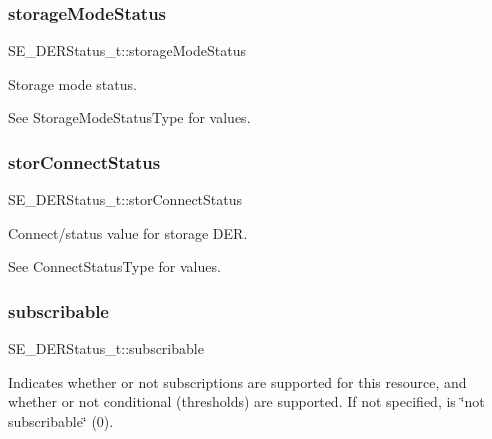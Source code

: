 \subsubsection{\texorpdfstring{storage\+Mode\+Status}{storageModeStatus}}
{\footnotesize\ttfamily S\+E\+\_\+\+D\+E\+R\+Status\+\_\+t\+::storage\+Mode\+Status}

Storage mode status.

See Storage\+Mode\+Status\+Type for values. \mbox{\label{group__DERStatus_ga008c4b8df0ff5f20ee6ffc4336bda96e}} 
\subsubsection{\texorpdfstring{stor\+Connect\+Status}{storConnectStatus}}
{\footnotesize\ttfamily S\+E\+\_\+\+D\+E\+R\+Status\+\_\+t\+::stor\+Connect\+Status}

Connect/status value for storage D\+ER.

See Connect\+Status\+Type for values. \mbox{\label{group__DERStatus_ga6880d05b460ec1817d4bda4904674639}} 
\subsubsection{\texorpdfstring{subscribable}{subscribable}}
{\footnotesize\ttfamily S\+E\+\_\+\+D\+E\+R\+Status\+\_\+t\+::subscribable}

Indicates whether or not subscriptions are supported for this resource, and whether or not conditional (thresholds) are supported. If not specified, is \char`\"{}not subscribable\char`\"{} (0). 